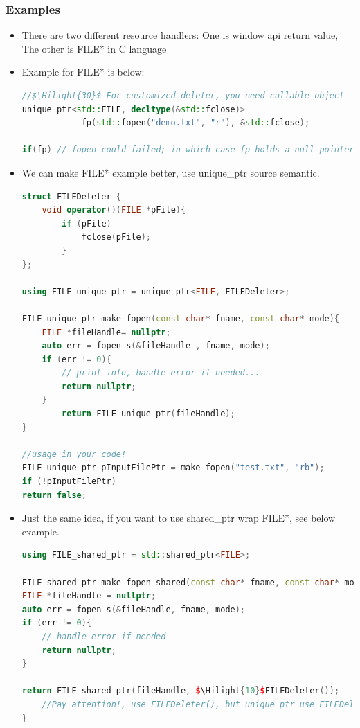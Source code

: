 \documentclass[a4paper,11pt,twoside]{book}
\newcommand{\Hilight}[1]{\makebox[0pt][l]{\color{yellow}\rule[-3pt]{#1em}{11pt}}}
\newcommand{\Hilight}[1]{}
\begin{document}
\subsubsection{Examples}
\begin{itemize}
	\item There are two different resource handlers: One is window api return value, The other is FILE* in C language
	
	\item Example for FILE* is below:
	
\begin{lstlisting}[frame=single, language=c++]
//$\Hilight{30}$ For customized deleter, you need callable object
unique_ptr<std::FILE, decltype(&std::fclose)> 
			fp(std::fopen("demo.txt", "r"), &std::fclose);
			
if(fp) // fopen could failed; in which case fp holds a null pointer
\end{lstlisting}
	
	\item We can make FILE* example better, use unique\_ptr source semantic.
\begin{lstlisting}[frame=single, language=c++]
struct FILEDeleter {
	void operator()(FILE *pFile){
		if (pFile)
			fclose(pFile);
		}
};
	
using FILE_unique_ptr = unique_ptr<FILE, FILEDeleter>;
	
FILE_unique_ptr make_fopen(const char* fname, const char* mode){
	FILE *fileHandle= nullptr;
	auto err = fopen_s(&fileHandle , fname, mode); 
	if (err != 0){
		// print info, handle error if needed...
		return nullptr;
	}
		return FILE_unique_ptr(fileHandle);
}
	
//usage in your code!
FILE_unique_ptr pInputFilePtr = make_fopen("test.txt", "rb");
if (!pInputFilePtr)
return false;
\end{lstlisting}
	
\item Just the same idea, if you want to use shared\_ptr wrap FILE*, see below example.
\begin{lstlisting}[frame=single, language=c++]
using FILE_shared_ptr = std::shared_ptr<FILE>;
	
FILE_shared_ptr make_fopen_shared(const char* fname, const char* mode){
FILE *fileHandle = nullptr;
auto err = fopen_s(&fileHandle, fname, mode);
if (err != 0){
	// handle error if needed
	return nullptr;
}
	
return FILE_shared_ptr(fileHandle, $\Hilight{10}$FILEDeleter());
	//Pay attention!, use FILEDeleter(), but unique_ptr use FILEDeleter
}
\end{lstlisting}
	

\end{itemize}
\end{document}
